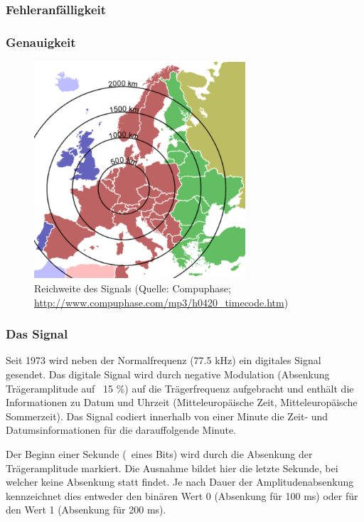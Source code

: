 \subsubsection{Fehleranfälligkeit}

\subsubsection{Genauigkeit}

\begin{figure}
  \begin{center}
    \includegraphics[width=0.7\textwidth]{./images/Analyse/DCF77_Reichweite.png}
  \end{center}
  \caption[Reichweite des Signals]{Reichweite des Signals (Quelle: Compuphase; 
  \url{http://www.compuphase.com/mp3/h0420_timecode.htm})} 
\end{figure}

\subsubsection{Das Signal}
Seit 1973 wird neben der Normalfrequenz (77.5 kHz) ein digitales Signal gesendet. Das digitale Signal wird durch negative Modulation (Absenkung Trägeramplitude auf ~15 \%) auf die Trägerfrequenz aufgebracht und enthält die Informationen zu Datum und Uhrzeit (Mitteleuropäische Zeit, Mitteleuropäische Sommerzeit). Das Signal codiert innerhalb von einer Minute die Zeit- und Datumsinformationen für die darauffolgende Minute.

Der Beginn einer Sekunde (~eines Bits) wird durch die Absenkung der Trägeramplitude markiert. Die Ausnahme bildet hier die letzte Sekunde, bei welcher keine Absenkung statt findet. Je nach Dauer der Amplitudenabsenkung kennzeichnet dies entweder den binären Wert 0 (Absenkung für 100 ms) oder für den Wert 1 (Absenkung für 200 ms).

